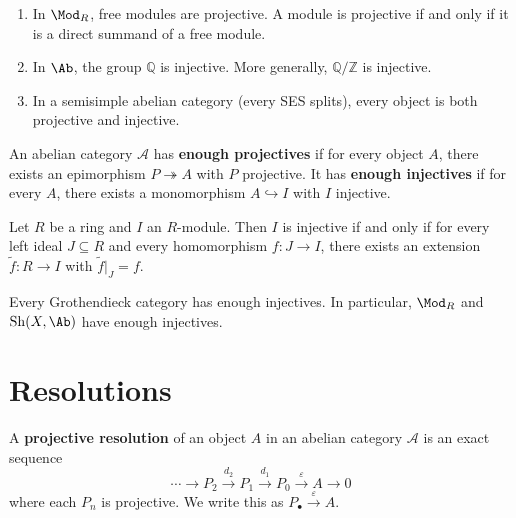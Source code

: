 \begin{example}\label{ex:proj-inj-examples}
\begin{enumerate}
    \item{}
    In $\Mod_R$, free modules are projective. A module is projective if and only if it
    is a direct summand of a free module.
    \item{}
    In $\Ab$, the group $\mathbb{Q}$ is injective. More generally, $\mathbb{Q}/\mathbb{Z}$
    is injective.
    \item In a semisimple abelian category (every SES splits), every object is both
    projective and injective.
\end{enumerate}
\end{example}

\begin{definition}\label{def:enough-proj-inj}
An abelian category $\mathcal{A}$ has \textbf{enough projectives} if for every object $A$,
there exists an epimorphism $P \twoheadrightarrow A$ with $P$ projective. It has
\textbf{enough injectives} if for every $A$, there exists a monomorphism $A \hookrightarrow I$
with $I$ injective.
\end{definition}

\begin{theorem}\label{thm:baer-criterion}
Let $R$ be a ring and $I$ an $R$-module. Then $I$ is injective if and only if for every
left ideal $J \subseteq R$ and every homomorphism $f \colon J \to I$, there exists an
extension $\tilde{f} \colon R \to I$ with $\tilde{f}|_J = f$.
\end{theorem}

\begin{theorem}\label{thm:grothendieck-injectives}
Every Grothendieck category has enough injectives. In particular, $\Mod_R$ and
$\operatorname{Sh}(X, \Ab)$ have enough injectives.
\end{theorem}


\section{Resolutions}\label{sec:resolutions}

\begin{definition}\label{def:proj-resolution}
A \textbf{projective resolution} of an object $A$ in an abelian category $\mathcal{A}$
is an exact sequence
\[
    \cdots \longrightarrow P_2 \xrightarrow{d_2} P_1 \xrightarrow{d_1} P_0
    \xrightarrow{\varepsilon} A \longrightarrow 0
\]
where each $P_n$ is projective. We write this as $P_\bullet \xrightarrow{\varepsilon} A$.
\end{definition}

